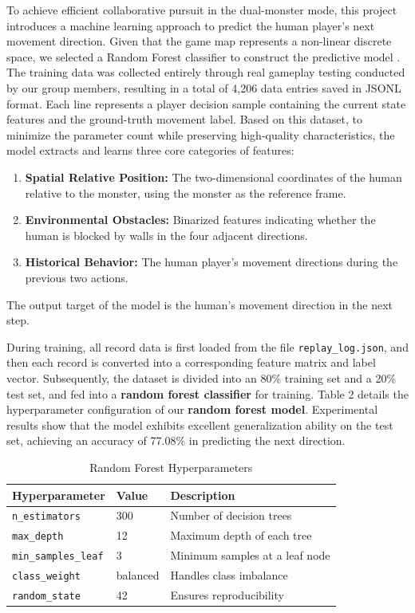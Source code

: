 \documentclass[12pt,a4paper]{article}
\begin{document}
To achieve efficient collaborative pursuit in the dual-monster mode, this project introduces a machine learning approach to predict the human player's next movement direction. Given that the game map represents a non-linear discrete space, we selected a Random Forest classifier to construct the predictive model . The training data was collected entirely through real gameplay testing conducted by our group members, resulting in a total of 4,206 data entries saved in JSONL format. Each line represents a player decision sample containing the current state features and the ground-truth movement label. Based on this dataset, to minimize the parameter count while preserving high-quality characteristics, the model extracts and learns three core categories of features: 
\begin{enumerate}
    \item \textbf{Spatial Relative Position:} The two-dimensional coordinates of the human relative to the monster, using the monster as the reference frame.
    \item \textbf{Environmental Obstacles:} Binarized features indicating whether the human is blocked by walls in the four adjacent directions.
    \item \textbf{Historical Behavior:} The human player's movement directions during the previous two actions. 
\end{enumerate}
The output target of the model is the human's movement direction in the next step.

During training, all record data is first loaded from the file \texttt{replay\_log.json}, and then each record is converted into a corresponding feature matrix and label vector. Subsequently, the dataset is divided into an 80\% training set and a 20\% test set, and fed into a \textbf{random forest classifier} for training. Table 2 details the hyperparameter configuration of our \textbf{random forest model}. Experimental results show that the model exhibits excellent generalization ability on the test set, achieving an accuracy of 77.08\% in predicting the next direction.

\begin{table}[htbp]
    \centering
    \small
    \caption{Random Forest Hyperparameters}
    \label{tab:rf_hyperparameters}
    \begin{tabular}{lll}
        \toprule
        Hyperparameter & Value & Description \\
        \midrule
        \texttt{n\_estimators}      & 300      & Number of decision trees \\
        \texttt{max\_depth}         & 12       & Maximum depth of each tree \\
        \texttt{min\_samples\_leaf} & 3        & Minimum samples at a leaf node \\
        \texttt{class\_weight}      & balanced & Handles class imbalance \\
        \texttt{random\_state}      & 42       & Ensures reproducibility \\
        \bottomrule
    \end{tabular}
\end{table}
\end{document}
